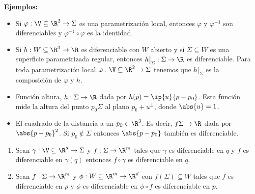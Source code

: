 \documentclass{article}
\begin{document}
\noindent\textbf{Ejemplos:}
\begin{itemize}
    \item Si $\varphi:\V\subseteq\R^{2}\to\Sigma$ es una parametrización local, entonces 
    $\varphi$ y $\varphi^{-1}$ son diferenciables y $\varphi^{-1}\circ\varphi$ es la identidad.

    \item Si $h:W\subseteq\R^{3}\to\R$ es diferenciable con $W$ abierto y si $\Sigma\subseteq W$
    es una superficie parametrizada regular, entonces $h\big|_{\Sigma}:\Sigma\to\R$ es 
    diferenciable. Para toda parametrización local $\varphi:\V\subseteq\R^{2}\to\Sigma$ tenemos que
    $h\big|_{\Sigma}$ es la composición de $\varphi$ y $h$.

    \item Función altura, $h:\Sigma\to\R$ dada por $h(p)=\ip{u}{p-p_{0}}$. Esta función mide la 
    altura del punto $p_{0}\Sigma$ al plano $p_{0}+u^{\perp}$, donde $\abs{u}=1$.
    
    \item El cuadrado de la distancia a un $p_{0}\in\R^{3}$. Es decir, $f\Sigma\to\R$ dada por
    $\abs{p-p_{0}}^{2}$. Si $p_{0}\not\in\Sigma$ entonces $\abs{p-p_{0}}$ también es diferenciable.
\end{itemize}

\begin{lema}\hspace{1mm}
    \begin{enumerate}
        \item Sean $\gamma:\V\subseteq\R^{d}\to\Sigma$ y $f:\Sigma\to\R^{m}$ tales que $\gamma$ es
        diferenciable en $q$ y $f$ es diferenciable en $\gamma(q)$ entonces $f\circ\gamma$ es
        diferenciable en $q$.

        \item Sean $f:\Sigma\to\R^{m}$ y $\phi:W\subseteq\R^{m}\to\R^{d}$ con 
        $f(\Sigma)\subseteq W$ tales que $f$ es diferenciable en $p$ y $\phi$ es diferenciable en
        $\phi\circ f$ es diferenciable en $p$.
    \end{enumerate}
\end{lema}
\end{document}
